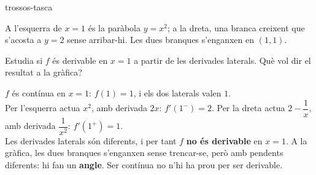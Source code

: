 \begin{apartats}
\begin{tria}{trossos-tasca}
\begin{solucio}
A l'esquerra de $x=1$ és la paràbola $y=x^2$; a la dreta, una branca creixent que s'acosta a
$y=2$ sense arribar-hi. Les dues branques s'enganxen en $(1,1)$.
\begin{center}
\end{center}
\end{solucio}

Estudia si $f$ és derivable en $x=1$ a partir de les derivades laterals. Què vol dir el resultat a
la gràfica?

\begin{solucio}
$f$ és contínua en $x=1$: $f(1)=1$, i els dos laterals valen $1$.\\
Per l'esquerra actua $x^2$, amb derivada $2x$: $f'\!\left(1^-\right)=2$. Per la dreta actua
$2-\dfrac1x$, amb derivada $\dfrac{1}{x^2}$: $f'\!\left(1^+\right)=1$.\\
Les derivades laterals són diferents, i per tant $f$ \textbf{no és derivable} en $x=1$. A la gràfica,
les dues branques s'enganxen sense trencar-se, però amb pendents diferents: hi fan un
\textbf{angle}. Ser contínua no n'hi ha prou per ser derivable.
\end{solucio}
\end{tria}

\end{apartats}
